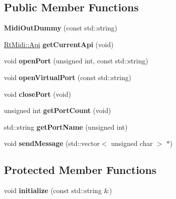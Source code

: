 \subsection*{Public Member Functions}
\begin{DoxyCompactItemize}
\item 
{\bfseries Midi\+Out\+Dummy} (const std\+::string)\hypertarget{class_midi_out_dummy_a809734c58e670d5905a18f0311d1ea81}{}\label{class_midi_out_dummy_a809734c58e670d5905a18f0311d1ea81}

\item 
\hyperlink{class_rt_midi_aac66af04a85fe5c5f07c360574a19406}{Rt\+Midi\+::\+Api} {\bfseries get\+Current\+Api} (void)\hypertarget{class_midi_out_dummy_a02b193d3be04659c50d361d08cd6f9a2}{}\label{class_midi_out_dummy_a02b193d3be04659c50d361d08cd6f9a2}

\item 
void {\bfseries open\+Port} (unsigned int, const std\+::string)\hypertarget{class_midi_out_dummy_a58dd8f29d4e5d39f96088eafb2ebf9b4}{}\label{class_midi_out_dummy_a58dd8f29d4e5d39f96088eafb2ebf9b4}

\item 
void {\bfseries open\+Virtual\+Port} (const std\+::string)\hypertarget{class_midi_out_dummy_af624fa80a6233a3182c54bdab22de1ef}{}\label{class_midi_out_dummy_af624fa80a6233a3182c54bdab22de1ef}

\item 
void {\bfseries close\+Port} (void)\hypertarget{class_midi_out_dummy_a36371dcb82892ed39816d98c42b39072}{}\label{class_midi_out_dummy_a36371dcb82892ed39816d98c42b39072}

\item 
unsigned int {\bfseries get\+Port\+Count} (void)\hypertarget{class_midi_out_dummy_a507c180b582ea60db189f558d4af39dc}{}\label{class_midi_out_dummy_a507c180b582ea60db189f558d4af39dc}

\item 
std\+::string {\bfseries get\+Port\+Name} (unsigned int)\hypertarget{class_midi_out_dummy_a9587a649810f296f7e47eb9642e11720}{}\label{class_midi_out_dummy_a9587a649810f296f7e47eb9642e11720}

\item 
void {\bfseries send\+Message} (std\+::vector$<$ unsigned char $>$ $\ast$)\hypertarget{class_midi_out_dummy_a0936b3c4aeb22ad85311d2e61951a49a}{}\label{class_midi_out_dummy_a0936b3c4aeb22ad85311d2e61951a49a}

\end{DoxyCompactItemize}
\subsection*{Protected Member Functions}
\begin{DoxyCompactItemize}
\item 
void {\bfseries initialize} (const std\+::string \&)\hypertarget{class_midi_out_dummy_ad051b2c8f7589aa3250fb0a9f095d8ef}{}\label{class_midi_out_dummy_ad051b2c8f7589aa3250fb0a9f095d8ef}

\end{DoxyCompactItemize}
